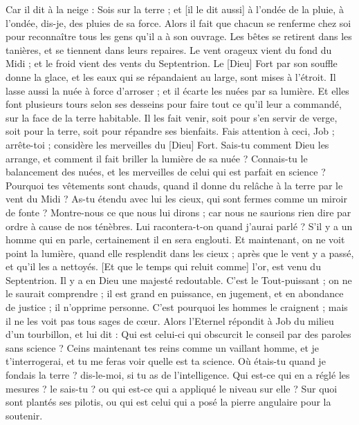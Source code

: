 \begin{multicols}{2}
Car il dit à la neige : Sois sur la terre ; et [il le dit aussi] à l'ondée de la pluie, à l'ondée, dis-je, des pluies de sa force.
Alors il fait que chacun se renferme chez soi pour reconnaître tous les gens qu'il a à son ouvrage.
Les bêtes se retirent dans les tanières, et se tiennent dans leurs repaires.
Le vent orageux vient du fond du Midi ; et le froid vient des vents du Septentrion.
Le [Dieu] Fort par son souffle donne la glace, et les eaux qui se répandaient au large, sont mises à l'étroit.
Il lasse aussi la nuée à force d'arroser ; et il écarte les nuées par sa lumière.
Et elles font plusieurs tours selon ses desseins pour faire tout ce qu'il leur a commandé, sur la face de la terre habitable.
Il les fait venir, soit pour s'en servir de verge, soit pour la terre, soit pour répandre ses bienfaits.
Fais attention à ceci, Job ; arrête-toi ; considère les merveilles du [Dieu] Fort.
Sais-tu comment Dieu les arrange, et comment il fait briller la lumière de sa nuée ?
Connais-tu le balancement des nuées, et les merveilles de celui qui est parfait en science ?
Pourquoi tes vêtements sont chauds, quand il donne du relâche à la terre par le vent du Midi ?
As-tu étendu avec lui les cieux, qui sont fermes comme un miroir de fonte ?
Montre-nous ce que nous lui dirons ; car nous ne saurions rien dire par ordre à cause de nos ténèbres.
Lui racontera-t-on quand j'aurai parlé ? S'il y a un homme qui en parle, certainement il en sera englouti.
Et maintenant, on ne voit point la lumière, quand elle resplendit dans les cieux ; après que le vent y a passé, et qu'il les a nettoyés.
[Et que le temps qui reluit comme] l'or, est venu du Septentrion. Il y a en Dieu une majesté redoutable.
C'est le Tout-puissant ; on ne le saurait comprendre ; il est grand en puissance, en jugement, et en abondance de justice ; il n'opprime personne.
C'est pourquoi les hommes le craignent ; mais il ne les voit pas tous sages de cœur.
\VerseOne{}Alors l'Eternel répondit à Job du milieu d'un tourbillon, et lui dit :
Qui est celui-ci qui obscurcit le conseil par des paroles sans science ?
Ceins maintenant tes reins comme un vaillant homme, et je t'interrogerai, et tu me feras voir quelle est ta science.
Où étais-tu quand je fondais la terre ? dis-le-moi, si tu as de l'intelligence.
Qui est-ce qui en a réglé les mesures ? le sais-tu ? ou qui est-ce qui a appliqué le niveau sur elle ?
Sur quoi sont plantés ses pilotis, ou qui est celui qui a posé la pierre angulaire pour la soutenir.

\end{multicols}
